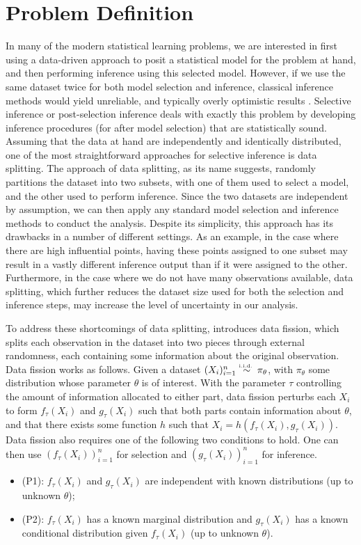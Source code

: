 \section{Problem Definition}\label{sec:problem_def}
In many of the modern statistical learning problems, we are interested in first using a data-driven approach to posit a statistical model for the problem at hand, and then performing inference using this selected model. However, if we use the same dataset twice for both model selection and inference, classical inference methods would yield unreliable, and typically overly optimistic results \citep{hong2018overfitting}. Selective inference or post-selection inference deals with exactly this problem by developing inference procedures (for after model selection) that are statistically sound. Assuming that the data at hand are independently and identically distributed, one of the most straightforward approaches for selective inference is data splitting. The approach of data splitting, as its name suggests, randomly partitions the dataset into two subsets, with one of them used to select a model, and the other used to perform inference. Since the two datasets are independent by assumption, we can then apply any standard model selection and inference methods to conduct the analysis. Despite its simplicity, this approach has its drawbacks in a number of different settings. As an example, in the case where there are high influential points, having these points assigned to one subset may result in a vastly different inference output than if it were assigned to the other. Furthermore, in the case where we do not have many observations available, data splitting, which further reduces the dataset size used for both the selection and inference steps, may increase the level of uncertainty in our analysis.

To address these shortcomings of data splitting, \cite{leiner2022data} introduces data fission, which splits each observation in the dataset into two pieces through external randomness, each containing some information about the original observation. Data fission works as follows. Given a dataset $(X_i)_{i=1}^n \overset{\textrm{\tiny i.i.d.\ }}{\sim} \pi_\theta$, with $\pi_\theta$ some distribution whose parameter $\theta$ is of interest. With the parameter $\tau$ controlling the amount of information allocated to either part, data fission perturbs each $X_i$ to form $f_\tau(X_i)$ and $g_\tau(X_i)$ such that both parts contain information about $\theta$, and that there exists some function $h$ such that $X_i = h(f_\tau(X_i), g_\tau(X_i))$. Data fission also requires one of the following two conditions to hold. One can then use $\left(f_\tau(X_i)\right)_{i=1}^n$ for selection and $\left(g_\tau(X_i)\right)_{i=1}^n$ for inference.
\begin{itemize}
\item (P1): $f_\tau(X_i)$ and $g_\tau(X_i)$ are independent with known distributions (up to unknown $\theta$);
\item (P2): $f_\tau(X_i)$ has a known marginal distribution and $g_\tau(X_i)$ has a known conditional distribution given $f_\tau(X_i)$ (up to unknown $\theta$).
\end{itemize}

